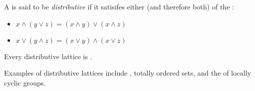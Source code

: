 \documentclass[12pt]{article}
\begin{document}

A  is said to be \emph{distributive} if it satisifes either (and therefore both) of the :
\begin{itemize}
\item $x \land (y \lor z) = (x \land y) \lor (x \land z)$ 
\item $x \lor (y \land z) = (x \lor y) \land (x \lor z)$
\end{itemize}
Every distributive lattice is .

Examples of distributive lattices include , totally ordered sets, and the  of locally cyclic groups.
\end{document}

